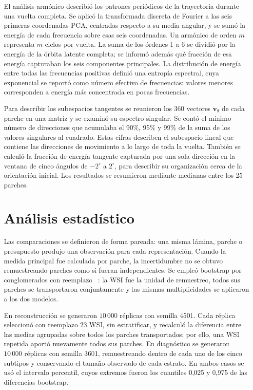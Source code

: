 El análisis armónico describió los patrones periódicos de la trayectoria
durante una vuelta completa. Se aplicó la transformada discreta de Fourier a
las seis primeras coordenadas PCA, centradas respecto a su media angular, y
se sumó la energía de cada frecuencia sobre esas seis coordenadas. Un armónico
de orden \(m\) representa \(m\) ciclos por vuelta. La suma de los órdenes 1
a 6 se dividió por la energía de la órbita latente completa; se informó además
qué fracción de esa energía capturaban los seis componentes principales. La
distribución de energía entre todas las frecuencias positivas definió una
entropía espectral, cuya exponencial se reportó como número efectivo de
frecuencias: valores menores corresponden a energía más concentrada en pocas
frecuencias.

Para describir los subespacios tangentes se reunieron los 360 vectores
\(\mathbf v_\theta\) de cada parche en una matriz y se examinó su espectro
singular. Se contó el mínimo número de direcciones que acumulaba el 90\%,
95\% y 99\% de la suma de los valores singulares al cuadrado. Estas cifras
describen el subespacio lineal que contiene las direcciones de movimiento a lo
largo de toda la vuelta. También se calculó la fracción de energía tangente
capturada por una sola dirección en la ventana de cinco ángulos de
\(-2^\circ\) a \(2^\circ\), para describir su organización cerca de la
orientación inicial. Los resultados se resumieron mediante medianas entre
los 25 parches.

\section{Análisis estadístico}

Las comparaciones se definieron de forma pareada: una misma lámina, parche o
presupuesto produjo una observación para cada representación. Cuando la medida
principal fue calculada por parche, la incertidumbre no se obtuvo
remuestreando parches como si fueran independientes. Se empleó bootstrap por conglomerados con reemplazo
~\cite{field_bootstrapping_2007}: la WSI fue la unidad de
remuestreo, todos sus parches se transportaron conjuntamente y las mismas
multiplicidades se aplicaron a los dos modelos.

En reconstrucción se generaron \(10\,000\) réplicas con semilla 4501. Cada
réplica seleccionó con reemplazo 23 WSI, sin estratificar, y recalculó la
diferencia entre las medias agrupadas sobre todos los parches transportados;
por ello, una WSI repetida aportó nuevamente todos sus parches. En diagnóstico
se generaron \(10\,000\) réplicas con semilla 3601, remuestreando dentro de
cada uno de los cinco subtipos y conservando el tamaño observado de cada
estrato. En ambos casos se usó el intervalo percentil, cuyos extremos fueron
los cuantiles 0,025 y 0,975 de las diferencias bootstrap.

